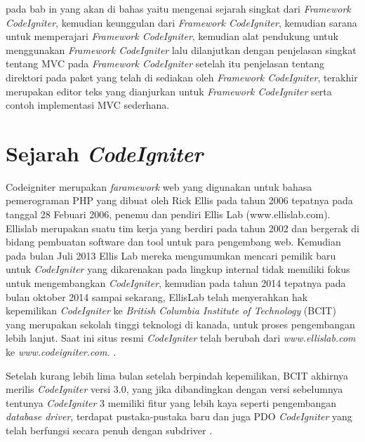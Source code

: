 
pada bab in yang akan di bahas yaitu mengenai sejarah singkat dari \textit{Framework CodeIgniter}, kemudian keunggulan dari \textit{Framework CodeIgniter},
kemudian sarana untuk memperajari \textit{Framework CodeIgniter}, kemudian alat pendukung untuk menggunakan \textit{Framework CodeIgniter} lalu dilanjutkan dengan penjelasan singkat tentang MVC 
pada \textit{Framework CodeIgniter} setelah itu penjelasan tentang direktori pada paket yang telah di sediakan oleh \textit{Framework CodeIgniter}, terakhir merupakan editor teks yang dianjurkan
 untuk \textit{Framework CodeIgniter} serta contoh implementasi MVC sederhana.\pagebreak

\section{Sejarah \textit{CodeIgniter}}
Codeigniter merupakan \textit{faramework} web yang digunakan untuk bahasa pemerograman PHP yang dibuat oleh Rick Ellis pada tahun 2006 tepatnya pada tanggal 28 Febuari 2006,  penemu dan pendiri Ellis Lab (www.ellislab.com). Ellislab merupakan suatu tim kerja yang berdiri pada tahun 2002 dan bergerak di bidang pembuatan software dan tool untuk para pengembang web. Kemudian pada bulan Juli 2013 Ellis Lab mereka mengumumkan mencari pemilik baru untuk \textit{CodeIgniter} yang dikarenakan pada lingkup internal tidak memiliki fokus untuk mengembangkan \textit{CodeIgniter}, kemudian pada tahun 2014 tepatnya pada bulan oktober 2014 sampai sekarang, EllisLab telah menyerahkan hak kepemilikan \textit{CodeIgniter} ke \textit{British Columbia Institute of Technology} (BCIT) yang merupakan sekolah tinggi teknologi di kanada, untuk proses pengembangan lebih lanjut. Saat ini situs resmi \textit{CodeIgniter} telah berubah dari \textit{www.ellislab.com} ke \textit{www.codeigniter.com.} \cite{raharjo2015belajar}. \par

Setelah kurang lebih lima bulan setelah berpindah kepemilikan, BCIT akhirnya merilis \textit{CodeIgniter} versi 3.0, yang jika dibandingkan dengan versi sebelumnya tentunya \textit{CodeIgniter} 3 memiliki fitur yang lebih kaya seperti pengembangan \textit{database driver}, terdapat pustaka-pustaka baru dan juga PDO \textit{CodeIgniter} yang telah berfungsi secara penuh dengan subdriver \cite{subagia2018kolaborasi}.\par

